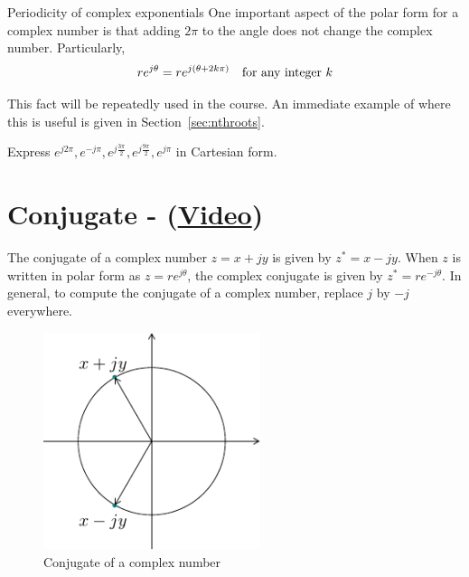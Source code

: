 \begin{infobox}{Periodicity of complex exponentials}
One important aspect of the polar form for a complex number is that adding $2 \pi$ to the angle does not change the complex number. Particularly,
\[
r e^{j\theta} = re^{j(\theta+2 k \pi)} \ \ \ \hbox{for any integer} \ k
\]
\end{infobox}
This fact will be repeatedly used in the course. An immediate example of where this is useful is given in Section~\ref{sec:nthroots}.


\begin{example}
Express $e^{j 2 \pi}, e^{-j \pi}, e^{j \frac{3 \pi}{2}}, e^{j \frac{9 \pi}{2}}, e^{j \pi}$ in Cartesian form.
\end{example}

\newpage

\section{Conjugate - (\href{https://youtu.be/Bhkp4Bs1SKg}{Video})}
The conjugate of a complex number $z = x + j y$ is given by
$z^* = x - j y$. When $z$ is written in polar form as $z = r e^{j \theta}$, the
complex conjugate is given by $z^* = r e^{-j \theta}$. In general, to compute the conjugate of a
complex number, replace $j$ by $-j$ everywhere.
\begin{figure}[hbt]
\begin{center}\includegraphics[width=2.5in]{../Images/ComplexNumbers/Fig_0_2.pdf}\end{center}
\caption{Conjugate of a complex number}
\label{fig:complexconjugate}
\end{figure}

